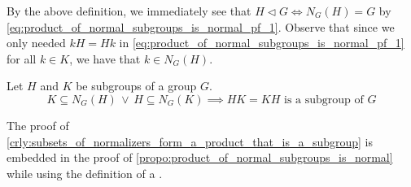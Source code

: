 \begin{note}
  By the above definition, we immediately see that $H \triangleleft G \iff N_G(H) = G$ by \cref{eq:product_of_normal_subgroups_is_normal_pf_1}. Observe that since we only needed $kH = Hk$ in \cref{eq:product_of_normal_subgroups_is_normal_pf_1} for all $k \in K$, we have that $k \in N_G(H)$.
\end{note}

\begin{crly}\label{crly:subsets_of_normalizers_form_a_product_that_is_a_subgroup}
  Let $H$ and $K$ be subgroups of a group $G$.
  \begin{equation*}
    K \subseteq N_G(H) \, \lor \, H \subseteq N_G(K) \implies HK = KH \text{ is a subgroup of } G
  \end{equation*}
\end{crly}

The proof of \cref{crly:subsets_of_normalizers_form_a_product_that_is_a_subgroup} is embedded in the proof of \cref{propo:product_of_normal_subgroups_is_normal} while using the definition of a .



